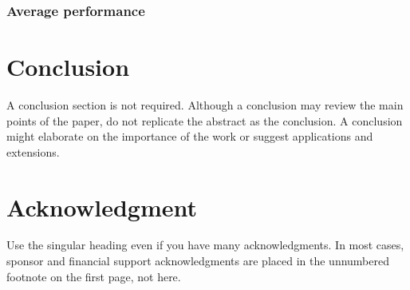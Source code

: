 \documentclass{IEEEtran}
\begin{document}
			\subsubsection{Average performance}\label{sec:results:position:benchmark}
    
    \section{Conclusion}\label{sec:conclusion}
        A conclusion section is not required. Although a conclusion may review the main points of the paper, do not replicate the abstract as the conclusion. A  conclusion might elaborate on the importance of the work or suggest applications and extensions. \cite{chen2018computational}
    
    \appendices
    
    \section*{Acknowledgment}
    
        Use the singular heading even if you have many acknowledgments. In most  cases, sponsor and financial support acknowledgments are placed in the  unnumbered footnote on the first page, not here.
    
    
    
    
        
    
\end{document}
